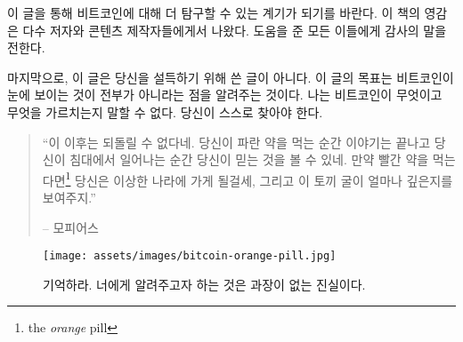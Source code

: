 	이 글을 통해 비트코인에 대해 더 탐구할 수 있는 계기가 되기를 바란다. 이 책의 영감은 다수 저자와
	콘텐츠 제작자들에게서 나왔다. 도움을 준 모든 이들에게 감사의 말을 전한다.
	
	마지막으로, 이 글은 당신을 설득하기 위해 쓴 글이 아니다. 이 글의 목표는 비트코인이 눈에 보이는 것이
	전부가 아니라는 점을 알려주는 것이다. 나는 비트코인이 무엇이고 무엇을 가르치는지 말할 수 없다. 당신이 스스로
	찾아야 한다.
	
	\begin{quotation}\begin{samepage}
	\enquote{이 이후는 되돌릴 수 없다네. 당신이 파란 약을 먹는 순간 이야기는 끝나고 당신이 침대에서 일어나는 순간
		당신이 믿는 것을 볼 수 있네. 만약 빨간 약을 먹는다면\footnote{the \textit{orange} pill} 당신은 이상한 나라에 가게 될걸세, 
		그리고 이 토끼 굴이 얼마나 깊은지를 보여주지.}
	\begin{flushright} -- 모피어스
	\end{flushright}\end{samepage}\end{quotation}
	
	\begin{figure}
\texttt{[image: assets/images/bitcoin-orange-pill.jpg]}
\caption*{기억하라. 너에게 알려주고자 하는 것은 과장이 없는 진실이다.}
\label{fig:bitcoin-orange-pill}
\end{figure}

%
%
%
